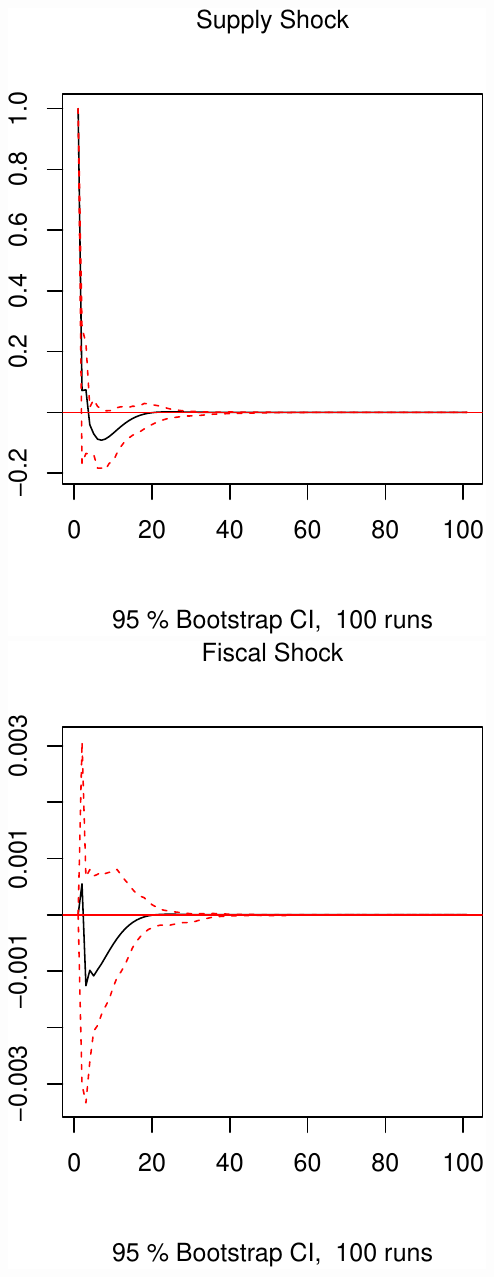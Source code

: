 \documentclass[11pt,preprint, authoryear]{elsarticle}
\numberwithin{equation}{section}
\numberwithin{figure}{section}
\numberwithin{table}{section}
\begin{document}
\includegraphics{TS_proj_files/figure-latex/unnamed-chunk-36-1.pdf}
\includegraphics{TS_proj_files/figure-latex/unnamed-chunk-36-2.pdf}
\end{document}
